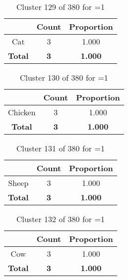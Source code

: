 \begin{table}[ht!]
\centering
\begin{tabular}{|c|c|c|}
\hline
\bf \Spec{} &\bf Count &\bf Proportion\\ \hline \hline
Cat & 3 & 1.000\\ \hline
\hline
\bf Total & \bf 3 & \bf 1.000\\ \hline
\end{tabular}
\label{tab:cluster:129:1}
\caption{Cluster 129 of 380 for \minneigh{}=1}
\end{table}

\clearpage
\begin{table}[ht!]
\centering
\begin{tabular}{|c|c|c|}
\hline
\bf \Spec{} &\bf Count &\bf Proportion\\ \hline \hline
Chicken & 3 & 1.000\\ \hline
\hline
\bf Total & \bf 3 & \bf 1.000\\ \hline
\end{tabular}
\label{tab:cluster:130:1}
\caption{Cluster 130 of 380 for \minneigh{}=1}
\end{table}

\begin{table}[ht!]
\centering
\begin{tabular}{|c|c|c|}
\hline
\bf \Spec{} &\bf Count &\bf Proportion\\ \hline \hline
Sheep & 3 & 1.000\\ \hline
\hline
\bf Total & \bf 3 & \bf 1.000\\ \hline
\end{tabular}
\label{tab:cluster:131:1}
\caption{Cluster 131 of 380 for \minneigh{}=1}
\end{table}

\begin{table}[ht!]
\centering
\begin{tabular}{|c|c|c|}
\hline
\bf \Spec{} &\bf Count &\bf Proportion\\ \hline \hline
Cow & 3 & 1.000\\ \hline
\hline
\bf Total & \bf 3 & \bf 1.000\\ \hline
\end{tabular}
\label{tab:cluster:132:1}
\caption{Cluster 132 of 380 for \minneigh{}=1}
\end{table}

